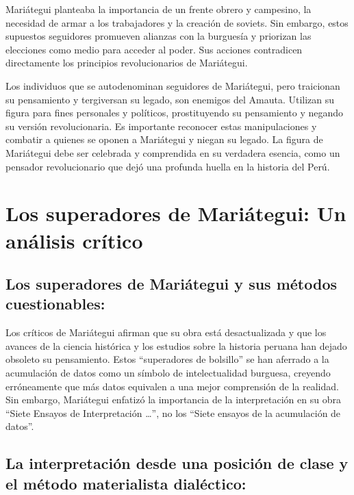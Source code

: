 \documentclass[
  a4paper,
]{article}
\begin{document}
Mariátegui planteaba la importancia de un frente obrero y campesino, la
necesidad de armar a los trabajadores y la creación de soviets. Sin
embargo, estos supuestos seguidores promueven alianzas con la burguesía
y priorizan las elecciones como medio para acceder al poder. Sus
acciones contradicen directamente los principios revolucionarios de
Mariátegui.

Los individuos que se autodenominan seguidores de Mariátegui, pero
traicionan su pensamiento y tergiversan su legado, son enemigos del
Amauta. Utilizan su figura para fines personales y políticos,
prostituyendo su pensamiento y negando su versión revolucionaria. Es
importante reconocer estas manipulaciones y combatir a quienes se oponen
a Mariátegui y niegan su legado. La figura de Mariátegui debe ser
celebrada y comprendida en su verdadera esencia, como un pensador
revolucionario que dejó una profunda huella en la historia del Perú.

\hypertarget{los-superadores-de-mariuxe1tegui-un-anuxe1lisis-cruxedtico}{%
\section{Los superadores de Mariátegui: Un análisis
crítico}\label{los-superadores-de-mariuxe1tegui-un-anuxe1lisis-cruxedtico}}

\hypertarget{los-superadores-de-mariuxe1tegui-y-sus-muxe9todos-cuestionables}{%
\subsection{Los superadores de Mariátegui y sus métodos
cuestionables:}\label{los-superadores-de-mariuxe1tegui-y-sus-muxe9todos-cuestionables}}

Los críticos de Mariátegui afirman que su obra está desactualizada y que
los avances de la ciencia histórica y los estudios sobre la historia
peruana han dejado obsoleto su pensamiento. Estos ``superadores de
bolsillo'' se han aferrado a la acumulación de datos como un símbolo de
intelectualidad burguesa, creyendo erróneamente que más datos equivalen
a una mejor comprensión de la realidad. Sin embargo, Mariátegui enfatizó
la importancia de la interpretación en su obra ``Siete Ensayos de
Interpretación \ldots{}'', no los ``Siete ensayos de la acumulación de
datos''.

\hypertarget{la-interpretaciuxf3n-desde-una-posiciuxf3n-de-clase-y-el-muxe9todo-materialista-dialuxe9ctico}{%
\subsection{La interpretación desde una posición de clase y el método
materialista
dialéctico:}\label{la-interpretaciuxf3n-desde-una-posiciuxf3n-de-clase-y-el-muxe9todo-materialista-dialuxe9ctico}}
\end{document}
